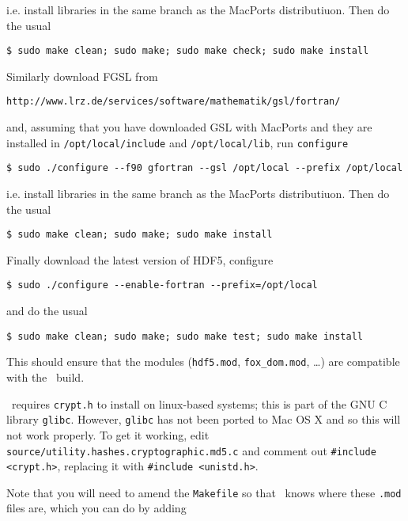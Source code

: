 i.e. install libraries in the same branch as the MacPorts distributiuon. Then do the usual

\begin{verbatim}
$ sudo make clean; sudo make; sudo make check; sudo make install
\end{verbatim}

Similarly download FGSL from

\begin{verbatim}
http://www.lrz.de/services/software/mathematik/gsl/fortran/
\end{verbatim}

and, assuming that you have downloaded GSL with MacPorts and they are installed in {\tt /opt/local/include} and {\tt /opt/local/lib}, run {\tt configure}

\begin{verbatim}
$ sudo ./configure --f90 gfortran --gsl /opt/local --prefix /opt/local
\end{verbatim}

i.e. install libraries in the same branch as the MacPorts distributiuon. Then do the usual

\begin{verbatim}
$ sudo make clean; sudo make; sudo make install
\end{verbatim}

Finally download the latest version of HDF5, configure

\begin{verbatim}
$ sudo ./configure --enable-fortran --prefix=/opt/local
\end{verbatim}

and do the usual

\begin{verbatim}
$ sudo make clean; sudo make; sudo make test; sudo make install
\end{verbatim}

This should ensure that the modules ({\tt hdf5.mod}, {\tt fox\_dom.mod}, \ldots) are compatible with the \glc\ build.

\glc\ requires {\tt crypt.h} to install on linux-based systems; this is part of the GNU C library {\tt glibc}. However, {\tt glibc} has not been ported to Mac OS X and so this will not work properly. To get it working, edit {\tt source/utility.hashes.cryptographic.md5.c} and comment out {\tt \#include \textless crypt.h\textgreater}, replacing it with {\tt \#include \textless unistd.h\textgreater}.

Note that you will need to amend the {\tt Makefile} so that \glc\ knows where these {\tt .mod} files are, which you can do by adding

